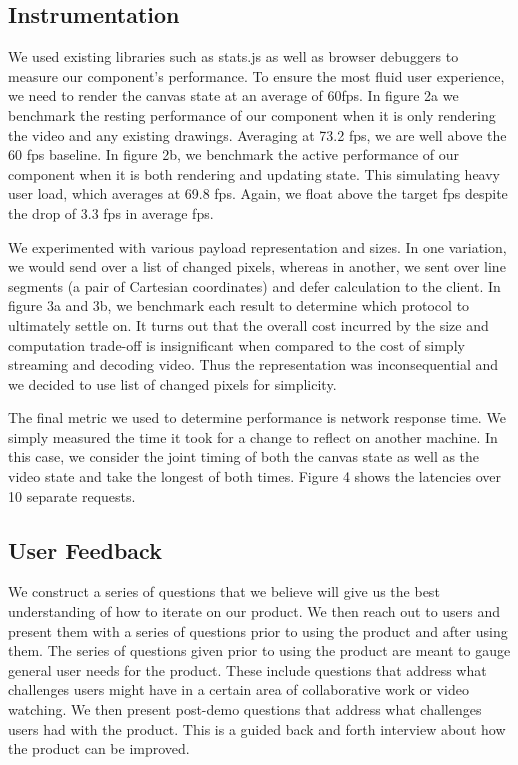 \documentclass[conference]{IEEEtran}
\begin{document}
\subsection{Instrumentation}
    We used existing libraries such as stats.js as well as browser debuggers to measure our component's performance. To ensure the most fluid user experience, we need to render the canvas state at an average of 60fps. In figure 2a we benchmark the resting performance of our component when it is only rendering the video and any existing drawings. Averaging at 73.2 fps, we are well above the 60 fps baseline. In figure 2b, we benchmark the active performance of our component when it is both rendering and updating state. This simulating heavy user load, which averages at 69.8 fps. Again, we float above the target fps despite the drop of 3.3 fps in average fps.

    We experimented with various payload representation and sizes. In one variation, we would send over a list of changed pixels, whereas in another, we sent over line segments (a pair of Cartesian coordinates) and defer calculation to the client. In figure 3a and 3b, we benchmark each result to determine which protocol to ultimately settle on. It turns out that the overall cost incurred by the size and computation trade-off is insignificant when compared to the cost of simply streaming and decoding video. Thus the representation was inconsequential and we decided to use list of changed pixels for simplicity.

    The final metric we used to determine performance is network response time. We simply measured the time it took for a change to reflect on another machine. In this case, we consider the joint timing of both the canvas state as well as the video state and take the longest of both times. Figure 4 shows the latencies over 10 separate requests.

\subsection{User Feedback}
    We construct a series of questions that we believe will give us the best understanding of how to iterate on our product. We then reach out to users and present them with a series of questions prior to using the product and after using them. The series of questions given prior to using the product are meant to gauge general user needs for the product. These include questions that address what challenges users might have in a certain area of collaborative work or video watching. We then present post-demo questions that address what challenges users had with the product. This is a guided back and forth interview about how the product can be improved.
\end{document}
